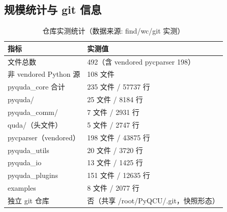 \documentclass[UTF8]{ctexart}
\begin{document}
\subsection{规模统计与 git 信息}
\begin{table}[htbp]\centering
\begin{tabular}{ll}
\toprule
指标 & 实测值 \\
\midrule
文件总数 & 492（含 vendored pycparser 198） \\
非 vendored Python 源 & 108 文件 \\
pyquda\_core 合计 & 235 文件 / 57737 行 \\
\hspace{1em}pyquda/ & 25 文件 / 8184 行 \\
\hspace{1em}pyquda\_comm/ & 7 文件 / 2931 行 \\
\hspace{1em}quda/（头文件） & 5 文件 / 2747 行 \\
\hspace{1em}pycparser（vendored） & 198 文件 / 43875 行 \\
pyquda\_utils & 20 文件 / 3720 行 \\
pyquda\_io & 13 文件 / 1425 行 \\
pyquda\_plugins & 151 文件 / 12635 行 \\
examples & 8 文件 / 2077 行 \\
独立 git 仓库 & 否（共享 /root/PyQCU/.git，快照形态） \\
\bottomrule
\end{tabular}
\caption{仓库实测统计（数据来源: find/wc/git 实测）}
\end{table}
\end{document}
